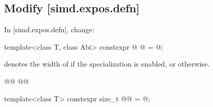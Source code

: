 \subsection{Modify [simd.expos.defn]}
In [simd.expos.defn], change:
\begin{wgText}\setcounter{Paras}{2}
\begin{itemdecl}
template<class T, class Abi>
  constexpr @ @ = @\seebelow@;
\end{itemdecl}

\begin{itemdescr}
\pnum
{} denotes the width of  if the specialization  is enabled, or 
otherwise.
\end{itemdescr}

\begin{itemdecl}
@@
  @@
\end{itemdecl}

\begin{itemdescr}
\pnumAdd
{}
\end{itemdescr}

\begin{itemdecl}
template<class T> constexpr size_t @@ = @\seebelow@;
\end{itemdecl}
\end{wgText}

